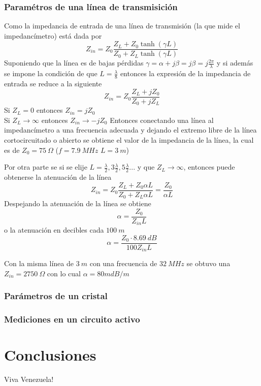 \documentclass[a4paper,10pt]{article}
\begin{document}
		\subsubsection{Param\'etros de una l\'inea de transmisici\'on}
		Como la impedancia de entrada de una l\'inea de transmisi\'on (la que mide el impedanc\'imetro) est\'a dada por $$Z_{in}=Z_0\frac{Z_L+Z_0\tanh(\gamma L)}{Z_0+Z_L\tanh(\gamma L)}$$
		Suponiendo que la l\'inea es de bajas p\'erdidas $\gamma=\alpha+j\beta=j\beta=j\frac{2\pi}{\lambda}$ y si adem\'as se impone la condici\'on de que $L=\frac{\lambda}{8}$ entonces la expresi\'on de la impedancia de entrada se reduce a la siguiente
		$$Z_{in}=Z_0\frac{Z_L+jZ_0}{Z_0+jZ_L}$$
		Si $Z_L= 0$ entonces $Z_{in}=jZ_0$ \\
		Si $Z_L \rightarrow \infty$ entonces $Z_{in}\rightarrow-jZ_0$
		Entonces conectando una l\'inea al impedanc\'imetro a una frecuencia adecuada y dejando el extremo libre de la l\'inea cortocircuitado o abierto se obtiene el valor de la impedancia de la l\'inea, la cual es de $Z_0=75~\Omega$ ($f=7.9~MHz$ $L=3~m$)
		
		Por otra parte se si se elije $L=\frac{\lambda}{2},3\frac{\lambda}{2}, 5\frac{\lambda}{2} ...$ y que $Z_L\rightarrow\infty$, entonces puede obtenerse la atenuaci\'on de la l\'inea
		$$Z_{in}=Z_0\frac{Z_L+Z_0\alpha L}{Z_0+Z_L\alpha L}=\frac{Z_0}{\alpha L}$$
		Despejando la atenuaci\'on de la l\'inea se obtiene
		$$\alpha=\frac{Z_0}{Z_{in} L}$$
		o la atenuaci\'on en decibles cada $100~m$
		$$\alpha=\frac{Z_0\cdot8.69~dB}{100Z_{in} L}$$
		
		Con la misma l\'inea de  $3~m$ con una frecuencia de $32~MHz$ se obtuvo una $Z_{in}=2750~\Omega$ con lo cual $\alpha=80 mdB/m$
		\subsubsection{Par\'ametros de un cristal}	
		\subsubsection{Mediciones en un circuito activo}
			
	\section{Conclusiones}
	\indent Viva Venezuela!\\
\end{document}
